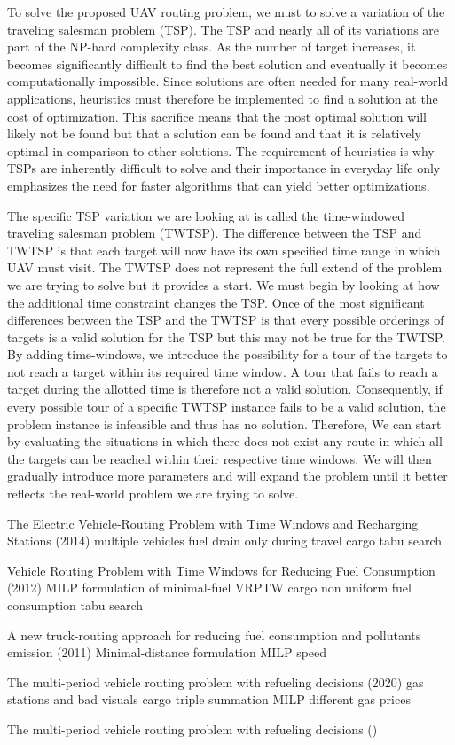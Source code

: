 To solve the proposed UAV routing problem, we must to solve a variation of the traveling salesman problem (TSP). The TSP and nearly all of its variations are part of the NP-hard complexity class. As the number of target increases, it becomes significantly difficult to find the best solution and eventually it becomes computationally impossible. Since solutions are often needed for many real-world applications, heuristics must therefore be implemented to find a solution at the cost of optimization. This sacrifice means that the most optimal solution will likely not be found but that a solution can be found and that it is relatively optimal in comparison to other solutions. The requirement of heuristics is why TSPs are inherently difficult to solve and their importance in everyday life only emphasizes the need for faster algorithms that can yield better optimizations.

The specific TSP variation we are looking at is called the time-windowed traveling salesman problem (TWTSP). The difference between the TSP and TWTSP is that each target will now have its own specified time range in which UAV must visit. The TWTSP does not represent the full extend of the problem we are trying to solve but it provides a start. We must begin by looking at how the additional time constraint changes the TSP. Once of the most significant differences between the TSP and the TWTSP is that every possible orderings of targets is a valid solution for the TSP but this may not be true for the TWTSP. By adding time-windows, we introduce the possibility for a tour of the targets to not reach a target within its required time window. A tour that fails to reach a target during the allotted time is therefore not a valid solution. Consequently, if every possible tour of a specific TWTSP instance fails to be a valid solution, the problem instance is infeasible and thus has no solution. Therefore,  We can start by evaluating the situations in which there does not exist any route in which all the targets can be reached within their respective time windows.  We will then gradually introduce more parameters and will expand the problem until it better reflects the real-world problem we are trying to solve.

The Electric Vehicle-Routing Problem with Time Windows and Recharging Stations (2014)
multiple vehicles
fuel drain only during travel
cargo
tabu search

Vehicle Routing Problem with Time Windows for Reducing Fuel Consumption (2012)
MILP formulation of minimal-fuel VRPTW 
cargo
non uniform fuel consumption
tabu search

A new truck-routing approach for reducing fuel consumption and pollutants emission (2011)
Minimal-distance formulation MILP
speed

The multi-period vehicle routing problem with refueling decisions (2020)
gas stations and bad visuals
cargo
triple summation MILP
different gas prices

The multi-period vehicle routing problem with refueling decisions ()
